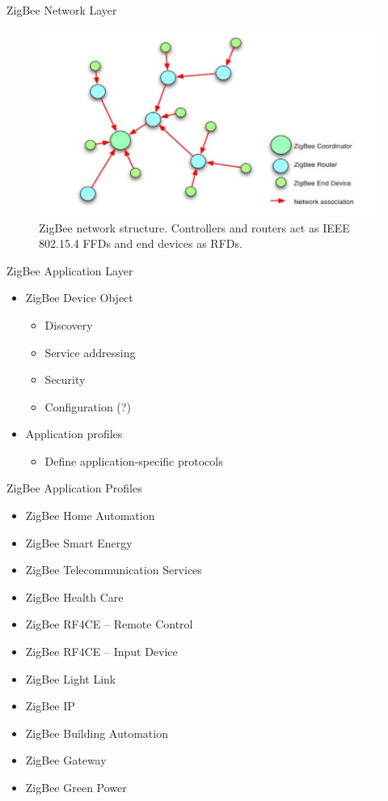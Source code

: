 \documentclass{beamer}
\begin{document}
\begin{frame}{ZigBee Network Layer}
  \begin{figure}
  \includegraphics[width=\textwidth]{zbnetstructure.png}
  \caption{ZigBee network structure. Controllers and routers act as IEEE 802.15.4 FFDs and end devices as RFDs.}
  \end{figure}
\end{frame}

\begin{frame}{ZigBee Application Layer}
  \begin{itemize}
  	\item ZigBee Device Object
  	\begin{itemize}
  		\item Discovery
  		\item Service addressing
  		\item Security
  		\item Configuration (?)
  	\end{itemize}
  	\item Application profiles
  	\begin{itemize}
  		\item Define application-specific protocols 
  	\end{itemize}
  \end{itemize}
\end{frame}

\begin{frame}{ZigBee Application Profiles}
  \begin{itemize}
  	\item ZigBee Home Automation
    \item ZigBee Smart Energy
    \item ZigBee Telecommunication Services
    \item ZigBee Health Care
    \item ZigBee RF4CE – Remote Control
    \item ZigBee RF4CE – Input Device
    \item ZigBee Light Link
    \item ZigBee IP
    \item ZigBee Building Automation
    \item ZigBee Gateway
    \item ZigBee Green Power
  \end{itemize}
\end{frame}
\end{document}
